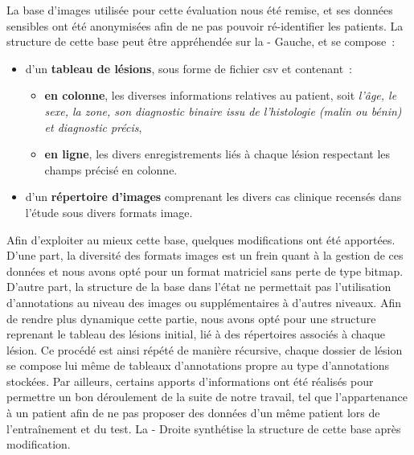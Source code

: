 La base d'images utilisée pour cette évaluation nous été remise, et ses données sensibles ont été anonymisées afin de ne pas pouvoir ré-identifier les patients. La structure de cette base peut être appréhendée sur la  - Gauche, et se compose~:
\begin{itemize}
    \item d'un \textbf{tableau de lésions}, sous forme de fichier \gls{csv} et contenant~:
    \begin{itemize}
        \item \textbf{en colonne}, les diverses informations relatives au patient, soit \textit{l'âge, le sexe, la zone, son diagnostic binaire issu de l'histologie (malin ou bénin) et diagnostic précis},
        \item \textbf{en ligne}, les divers enregistrements liés à chaque lésion respectant les champs précisé en colonne.
    \end{itemize}
    \item d'un \textbf{répertoire d'images} comprenant les divers cas clinique recensés dans l'étude sous divers formats image.
\end{itemize}\par

Afin d'exploiter au mieux cette base, quelques modifications ont été apportées. D'une part, la diversité des formats images est un frein quant à la gestion de ces données et nous avons opté pour un format matriciel sans perte de type bitmap. D'autre part, la structure de la base dans l'état ne permettait pas l'utilisation d'annotations au niveau des images ou supplémentaires à d'autres niveaux. Afin de rendre plus dynamique cette partie, nous avons opté pour une structure reprenant le tableau des lésions initial, lié à des répertoires associés à chaque lésion. Ce procédé est ainsi répété de manière récursive, chaque dossier de lésion se compose lui même de tableaux d'annotations propre au type d'annotations stockées. Par ailleurs, certains apports d'informations ont été réalisés pour permettre un bon déroulement de la suite de notre travail, tel que l'appartenance à un patient afin de ne pas proposer des données d'un même patient lors de l'entraînement et du test. La  - Droite synthétise la structure de cette base après modification.\par

